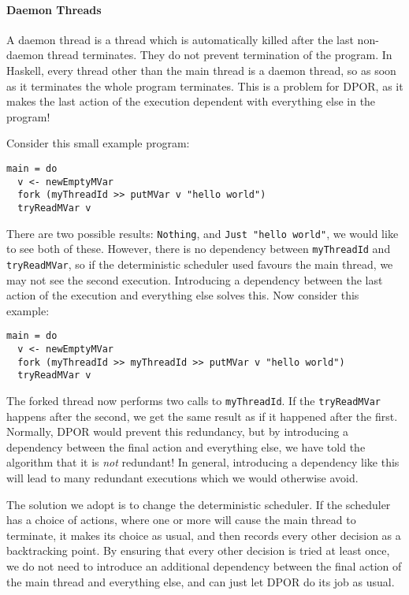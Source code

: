 \paragraph{Daemon Threads}
A daemon thread is a thread which is automatically killed after the
last non-daemon thread terminates.  They do not prevent termination of
the program.  In Haskell, every thread other than the main thread is a
daemon thread, so as soon as it terminates the whole program
terminates.  This is a problem for DPOR, as it makes the last action
of the execution dependent with everything else in the program!

Consider this small example program:

\begin{verbatim}
main = do
  v <- newEmptyMVar
  fork (myThreadId >> putMVar v "hello world")
  tryReadMVar v
\end{verbatim}

There are two possible results: \verb|Nothing|, and
\verb|Just "hello world"|, we would like to see both of these.
However, there is no dependency between \verb|myThreadId| and
\verb|tryReadMVar|, so if the deterministic scheduler used favours the
main thread, we may not see the second execution.  Introducing a
dependency between the last action of the execution and everything
else solves this.  Now consider this example:

\begin{verbatim}
main = do
  v <- newEmptyMVar
  fork (myThreadId >> myThreadId >> putMVar v "hello world")
  tryReadMVar v
\end{verbatim}

The forked thread now performs two calls to \verb|myThreadId|.  If the
\verb|tryReadMVar| happens after the second, we get the same result as
if it happened after the first.  Normally, DPOR would prevent this
redundancy, but by introducing a dependency between the final action
and everything else, we have told the algorithm that it is \emph{not}
redundant!  In general, introducing a dependency like this will lead
to many redundant executions which we would otherwise avoid.

The solution we adopt is to change the deterministic scheduler.  If
the scheduler has a choice of actions, where one or more will cause
the main thread to terminate, it makes its choice as usual, and then
records every other decision as a backtracking point.  By ensuring
that every other decision is tried at least once, we do not need to
introduce an additional dependency between the final action of the
main thread and everything else, and can just let DPOR do its job as
usual.

